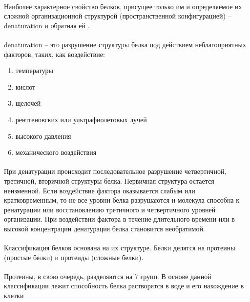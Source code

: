 \paragraph*{}Наиболее характерное свойство белков, присущее только им и определяемое их сложной организационной структурой (пространственной конфигурацией) -- \gls{denaturation} и обратная ей . 

\paragraph*{}\gls{denaturation} -- это разрушение структуры белка под действием неблагоприятных факторов, таких, как воздействие:

\begin{enumerate}

	\item температуры
	\item кислот
	\item щелочей
	\item рентгеновских или ультрафиолетовых лучей
	\item высокого давления 
	\item механического воздействия

\end{enumerate}
 
\paragraph*{}При денатурации происходит последовательное разрушение четвертичной, третичной, вторичной структуры белка. Первичная структура остается неизменной. Если воздействие фактора оказывается слабым или кратковременным, то не все уровни белка разрушаются и молекула способна к ренатурации или восстановлению третичного и четвертичного уровней организации. При воздействии фактора в течение длительного времени или в высокой концентрации денатурация белка становится необратимой. 

\paragraph*{}Классификация белков основана на их структуре. Белки делятся на протеины (простые белки) и протеиды (сложные белки).

\paragraph*{}Протеины, в свою очередь, разделяются на 7 групп. В основе данной классификации лежит способность белка растворятся в воде и его нахождение в клетки


